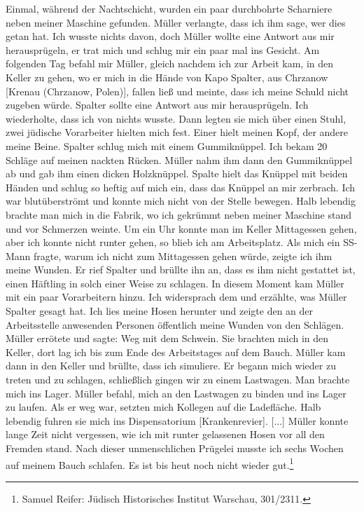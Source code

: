 \documentclass[a4paper,12pt,ngerman,
]{nisebook}
\begin{document}
\begin{leftbar}
Einmal, während der Nachtschicht, wurden ein paar durchbohrte Scharniere neben meiner Maschine gefunden. Müller verlangte, dass ich ihm sage, wer dies getan hat. Ich wusste nichts davon, doch Müller wollte eine Antwort aus mir herausprügeln, er trat mich und schlug mir ein paar mal ins Gesicht.\newline
Am folgenden Tag befahl mir Müller, gleich nachdem ich zur Arbeit kam, in den Keller zu gehen, wo er mich in die Hände von Kapo Spalter, aus Chrzanow [Krenau (Chrzanow, Polen)], fallen ließ und meinte, dass ich meine Schuld nicht zugeben würde. Spalter sollte eine Antwort aus mir herausprügeln. Ich wiederholte, dass ich von nichts wusste. Dann legten sie mich über einen Stuhl, zwei jüdische Vorarbeiter hielten mich fest. Einer hielt meinen Kopf, der andere meine Beine. Spalter schlug mich mit einem Gummiknüppel. Ich bekam 20 Schläge auf meinen nackten Rücken. Müller nahm ihm dann den Gummiknüppel ab und gab ihm einen dicken Holzknüppel. Spalte hielt das Knüppel mit beiden Händen und schlug so heftig auf mich ein, dass das Knüppel an mir zerbrach. Ich war blutüberströmt und konnte mich nicht von der Stelle bewegen. Halb lebendig brachte man mich in die Fabrik, wo ich gekrümmt neben meiner Maschine stand und vor Schmerzen weinte.\newline
Um ein Uhr konnte man im Keller Mittagessen gehen, aber ich konnte nicht runter gehen, so blieb ich am Arbeitsplatz. Als mich ein SS-Mann fragte, warum ich nicht zum Mittagessen gehen würde, zeigte ich ihm meine Wunden. Er rief Spalter und brüllte ihn an, dass es ihm nicht gestattet ist, einen Häftling in solch einer Weise zu schlagen. In diesem Moment kam Müller mit ein paar Vorarbeitern hinzu. Ich widersprach dem und erzählte, was Müller Spalter gesagt hat. Ich lies meine Hosen herunter und zeigte den an der Arbeitsstelle anwesenden Personen öffentlich meine Wunden von den Schlägen. Müller errötete und sagte: \glqq Weg mit dem Schwein\grqq. Sie brachten mich in den Keller, dort lag ich bis zum Ende des Arbeitstages auf dem Bauch. Müller kam dann in den Keller und brüllte, dass ich simuliere. Er begann mich wieder zu treten und zu schlagen, schließlich gingen wir zu einem Lastwagen. Man brachte mich ins Lager. Müller befahl, mich an den Lastwagen zu binden und ins Lager zu laufen. Als er weg war, setzten mich Kollegen auf die Ladefläche. Halb lebendig fuhren sie mich ins Dispensatorium [Krankenrevier]. [...]
Müller konnte lange Zeit nicht vergessen, wie ich mit runter gelassenen Hosen vor all den Fremden stand. Nach dieser unmenschlichen Prügelei musste ich sechs Wochen auf meinem Bauch schlafen. Es ist bis heut noch nicht wieder gut.\footnote{Samuel Reifer: Jüdisch Historisches Institut Warschau, 301/2311.}
\end{leftbar}
\end{document}
